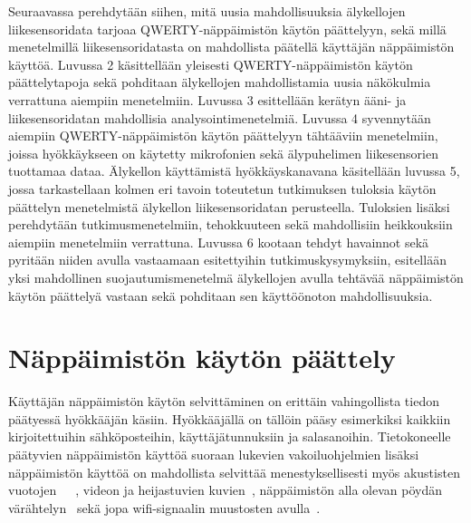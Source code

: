\documentclass[finnish]{tktltiki2}
\theoremstyle{definition}
\theoremstyle{remark}
\begin{document}
Seuraavassa perehdytään siihen, mitä uusia mahdollisuuksia älykellojen liikesensoridata tarjoaa QWERTY-näppäimistön käytön päättelyyn, sekä millä menetelmillä liikesensoridatasta on mahdollista päätellä käyttäjän näppäimistön käyttöä. 
Luvussa 2 käsittellään yleisesti QWERTY-näppäimistön käytön päättelytapoja sekä pohditaan älykellojen mahdollistamia uusia näkökulmia verrattuna aiempiin menetelmiin. Luvussa 3 esittellään kerätyn ääni- ja liikesensoridatan mahdollisia analysointimenetelmiä. Luvussa 4 syvennytään aiempiin QWERTY-näppäimistön käytön päättelyyn tähtääviin menetelmiin, joissa hyökkäykseen on käytetty mikrofonien sekä älypuhelimen liikesensorien tuottamaa dataa. Älykellon käyttämistä hyökkäyskanavana käsitellään luvussa 5, jossa tarkastellaan kolmen eri tavoin toteutetun tutkimuksen tuloksia käytön päättelyn menetelmistä älykellon liikesensoridatan perusteella. Tuloksien lisäksi perehdytään tutkimusmenetelmiin, tehokkuuteen sekä  mahdollisiin heikkouksiin aiempiin menetelmiin verrattuna. Luvussa 6 kootaan tehdyt havainnot sekä pyritään niiden avulla vastaamaan esitettyihin tutkimuskysymyksiin, esitellään yksi mahdollinen suojautumismenetelmä älykellojen avulla tehtävää näppäimistön käytön päättelyä vastaan sekä pohditaan sen käyttöönoton mahdollisuuksia. 


\pagebreak
\section{Näppäimistön käytön päättely}
Käyttäjän näppäimistön käytön selvittäminen on erittäin vahingollista tiedon päätyessä hyökkääjän käsiin. Hyökkääjällä on tällöin pääsy esimerkiksi kaikkiin kirjoitettuihin sähköposteihin, käyttäjätunnuksiin ja salasanoihin. Tietokoneelle päätyvien näppäimistön käyttöä suoraan lukevien vakoiluohjelmien lisäksi näppäimistön käyttöä on mahdollista selvittää menestyksellisesti myös akustisten vuotojen~\cite{berger}~\cite{zhu}~\cite{aso}, videon ja heijastuvien kuvien~\cite{balz}, näppäimistön alla olevan pöydän värähtelyn~\cite{mar} sekä jopa wifi-signaalin muustosten avulla~\cite{ali}.
\end{document}
